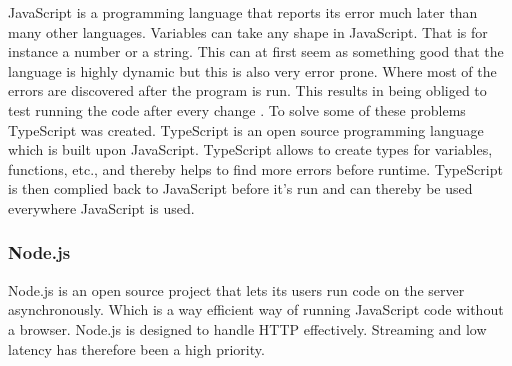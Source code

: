 JavaScript is a programming language that reports its error much later than many other languages. Variables can take any shape in JavaScript. That is for instance a number or a string. This can at first seem as something good that the language is highly dynamic but this is also very error prone. Where most of the errors are discovered after the program is run. This results in being obliged to test running the code after every change \cite{taivalsaari2008web}. To solve some of these problems TypeScript was created. TypeScript is an open source programming language which is built upon JavaScript. TypeScript allows to create types for variables, functions, etc., and thereby helps to find more errors before runtime. TypeScript is then complied back to JavaScript before it's run and can thereby be used everywhere JavaScript is used.




\subsubsection{Node.js}%
\label{ssub:Node}
Node.js is an open source project that lets its users run code on the server asynchronously. Which is a way efficient way of running JavaScript code without a browser. Node.js is designed to handle HTTP effectively. Streaming and low latency has therefore been a high priority.


